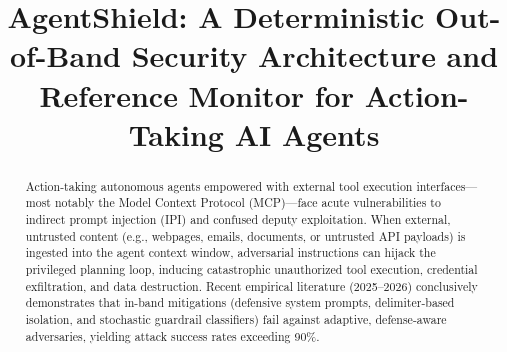\documentclass[conference]{IEEEtran}
\begin{document}
\title{AgentShield: A Deterministic Out-of-Band Security Architecture and Reference Monitor for Action-Taking AI Agents}

\author{
}

\maketitle

\begin{abstract}
Action-taking autonomous agents empowered with external tool execution interfaces---most notably the Model Context Protocol (MCP)---face acute vulnerabilities to indirect prompt injection (IPI) and confused deputy exploitation. When external, untrusted content (e.g., webpages, emails, documents, or untrusted API payloads) is ingested into the agent context window, adversarial instructions can hijack the privileged planning loop, inducing catastrophic unauthorized tool execution, credential exfiltration, and data destruction. Recent empirical literature (2025--2026) conclusively demonstrates that in-band mitigations (defensive system prompts, delimiter-based isolation, and stochastic guardrail classifiers) fail against adaptive, defense-aware adversaries, yielding attack success rates exceeding 90\%. 


\end{abstract}
\end{document}
